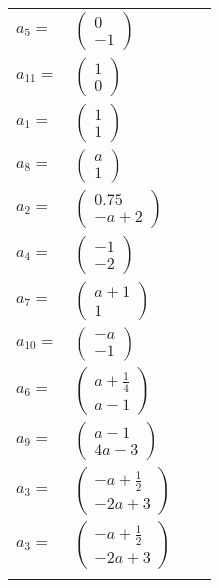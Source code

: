 \documentclass[1p]{elsarticle_modified}
\theoremstyle{definition}
\begin{document}
\begin{tabular}{m{7pt} m{180pt} m{7pt} m{180pt} }
\flushright $a_{5}=$&$\begin{pmatrix}0\\-1\end{pmatrix}$ \\
\flushright $a_{11}=$&$\begin{pmatrix}1\\0\end{pmatrix}$ \\
\flushright $a_{1}=$&$\begin{pmatrix}1\\1\end{pmatrix}$ \\
\flushright $a_{8}=$&$\begin{pmatrix}a\\1\end{pmatrix}$ \\
\flushright $a_{2}=$&$\begin{pmatrix}0.75\\- a+2\end{pmatrix}$ \\
\flushright $a_{4}=$&$\begin{pmatrix}-1\\-2\end{pmatrix}$ \\
\flushright $a_{7}=$&$\begin{pmatrix}a+1\\1\end{pmatrix}$ \\
\flushright $a_{10}=$&$\begin{pmatrix}- a\\-1\end{pmatrix}$ \\
\flushright $a_{6}=$&$\begin{pmatrix}a+\frac{1}{4}\\a-1\end{pmatrix}$ \\
\flushright $a_{9}=$&$\begin{pmatrix}a-1\\4 a-3\end{pmatrix}$ \\
\flushright $a_{3}=$&$\begin{pmatrix}- a+\frac{1}{2}\\-2 a+3\end{pmatrix}$\\ \flushright $a_{3}=$&$\begin{pmatrix}- a+\frac{1}{2}\\-2 a+3\end{pmatrix}$\\&\end{tabular}
\end{document}
